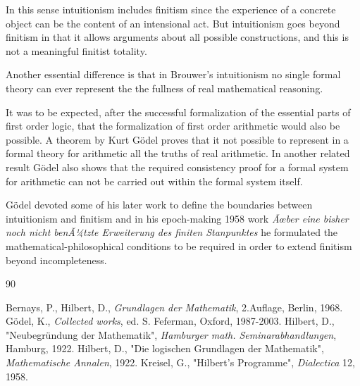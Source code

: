 \documentclass[12pt]{article}
\begin{document}
In this sense intuitionism includes finitism since the experience of a concrete object can be the content of an intensional act. But intuitionism goes beyond finitism in that it allows arguments about all possible constructions, and this is not a meaningful finitist totality.

Another essential difference is that in Brouwer's intuitionism no single formal theory can ever represent the the fullness of real mathematical reasoning.

It was to be expected, after the successful formalization of the essential parts of first order logic, that the formalization of first order arithmetic would also be possible. A theorem by Kurt G\"{o}del proves that it not possible to represent in a formal theory for arithmetic all the truths of real arithmetic. In another related result G\"{o}del also shows that the required consistency proof for a formal system for arithmetic  can not be carried out within the formal system itself.

G\"{o}del devoted some of his later work to define the boundaries between intuitionism and finitism and in his epoch-making 1958 work \emph{Ãœber eine  bisher noch nicht benÃ¼tzte Erweiterung des finiten Stanpunktes} he formulated the mathematical-philosophical conditions to be required in order to extend finitism beyond incompleteness.


\begin{thebibliography} {90}

 Bernays, P., Hilbert, D., \emph{Grundlagen der Mathematik}, 2.Auflage, Berlin, 1968.
 G\"{o}del, K., \emph{Collected works}, ed. S. Feferman, Oxford, 1987-2003.
 Hilbert, D., "Neubegr\"{u}ndung der Mathematik", \emph{Hamburger math. Seminarabhandlungen}, Hamburg,
1922.
 Hilbert, D., "Die logischen Grundlagen der Mathematik", \emph{Mathematische Annalen}, 1922.
 Kreisel, G., "Hilbert's Programme", \emph{Dialectica} 12, 1958.
\end{thebibliography}
\end{document}
